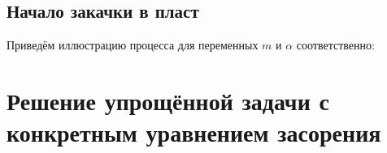 \documentclass[a4paper,12pt]{article}
\begin{document}
\subsection{Начало закачки в пласт}
\par Приведём иллюстрацию процесса для переменных $m$ и $\alpha$ соответственно:
\begin{figure}[h!]
\caption{}
\label{fig:image1}
\end{figure}
\pagebreak
\section{Решение упрощённой задачи с конкретным уравнением засорения}
\end{document}
